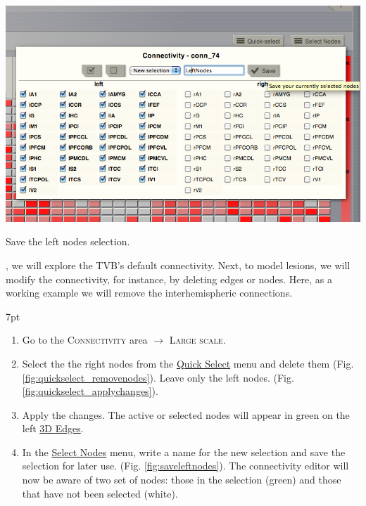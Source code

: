 \documentclass{tufte-handout}
\newenvironment{formal}{%
  \def\FrameCommand{%
    \hspace{1pt}%
    {\color{DarkBlue}\vrule width 2pt}%
    {\color{formalshade}\vrule width 4pt}%
    \colorbox{formalshade}%
  }%
  \MakeFramed{\advance\hsize-\width\FrameRestore}%
  \noindent\hspace{-4.55pt}%
  \begin{adjustwidth}{}{7pt}%
  \vspace{2pt}\vspace{2pt}%
}
{%
  \vspace{2pt}\end{adjustwidth}\endMakeFramed%
}
\begin{document}
\begin{marginfigure}%
  \includegraphics[width=\linewidth]{Handout_UI_ModellingStructuralLesions_SaveLeftNodes}%
  \caption{Save the left nodes selection.}%
  \label{fig:saveleftnodes}%
\end{marginfigure}%
, we will explore the TVB's default connectivity. Next, to model lesions, we will modify the connectivity, for
instance, by deleting edges or nodes. Here, as a working example we will remove the
interhemispheric connections. 


\begin{formal}
  \begin{enumerate}
  \item Go to the \textsc{Connectivity} area $\rightarrow$ \textsc{Large scale}.
  \item Select the the right nodes from the \underline{Quick Select} menu and delete them (Fig. \ref{fig:quickselect_removenodes}). Leave only the left nodes. (Fig. \ref{fig:quickselect_applychanges}). 
  \item Apply the changes. The active or selected nodes will appear in green on the left \underline{3D Edges}. 
  \item In the \underline{Select Nodes} menu, write a name for the new selection and save the selection for later use. (Fig. \ref{fig:saveleftnodes}). The connectivity editor will now be aware of two set of nodes: those in the selection (green) and those that have not been selected (white).
  \end{enumerate}
\end{formal}

\newpage
\end{document}
